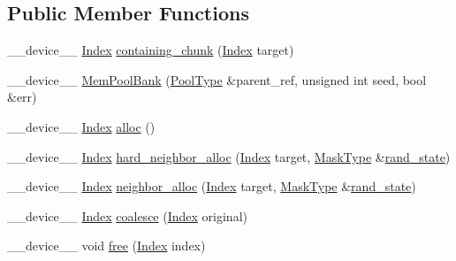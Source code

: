 \subsection*{Public Member Functions}
\begin{DoxyCompactItemize}
\item 
\-\_\-\-\_\-device\-\_\-\-\_\- \hyperlink{structMemPoolBank_a5f3e0490f2f4fe5dbf321cc00eb35007}{Index} \hyperlink{structMemPoolBank_abd671fc817e1dc55540b282f29ba30c7}{containing\-\_\-chunk} (\hyperlink{structMemPoolBank_a5f3e0490f2f4fe5dbf321cc00eb35007}{Index} target)
\item 
\-\_\-\-\_\-device\-\_\-\-\_\- \hyperlink{structMemPoolBank_a220229124f7046fdd4ff1d895786cddb}{Mem\-Pool\-Bank} (\hyperlink{structMemPoolBank_afae3596e9bd9f9245bc55fbe47356e96}{Pool\-Type} \&parent\-\_\-ref, unsigned int seed, bool \&err)
\item 
\-\_\-\-\_\-device\-\_\-\-\_\- \hyperlink{structMemPoolBank_a5f3e0490f2f4fe5dbf321cc00eb35007}{Index} \hyperlink{structMemPoolBank_aaec17b865ca8ea6a01991cede82db0e4}{alloc} ()
\item 
\-\_\-\-\_\-device\-\_\-\-\_\- \hyperlink{structMemPoolBank_a5f3e0490f2f4fe5dbf321cc00eb35007}{Index} \hyperlink{structMemPoolBank_ac569e5e2130db7ccb771a7553f20c20d}{hard\-\_\-neighbor\-\_\-alloc} (\hyperlink{structMemPoolBank_a5f3e0490f2f4fe5dbf321cc00eb35007}{Index} target, \hyperlink{structMemPoolBank_a35d618e084e7be124feef368925d46d5}{Mask\-Type} \&\hyperlink{structMemPoolBank_af9787855d48c00526151a602cb890f10}{rand\-\_\-state})
\item 
\-\_\-\-\_\-device\-\_\-\-\_\- \hyperlink{structMemPoolBank_a5f3e0490f2f4fe5dbf321cc00eb35007}{Index} \hyperlink{structMemPoolBank_a9b0e449e66be305417d76d036462b20a}{neighbor\-\_\-alloc} (\hyperlink{structMemPoolBank_a5f3e0490f2f4fe5dbf321cc00eb35007}{Index} target, \hyperlink{structMemPoolBank_a35d618e084e7be124feef368925d46d5}{Mask\-Type} \&\hyperlink{structMemPoolBank_af9787855d48c00526151a602cb890f10}{rand\-\_\-state})
\item 
\-\_\-\-\_\-device\-\_\-\-\_\- \hyperlink{structMemPoolBank_a5f3e0490f2f4fe5dbf321cc00eb35007}{Index} \hyperlink{structMemPoolBank_ade00e00d2225f23cc4ace6fa15ea9efc}{coalesce} (\hyperlink{structMemPoolBank_a5f3e0490f2f4fe5dbf321cc00eb35007}{Index} original)
\item 
\-\_\-\-\_\-device\-\_\-\-\_\- void \hyperlink{structMemPoolBank_aedee77671212371f77e63a5336836e4b}{free} (\hyperlink{structMemPoolBank_a5f3e0490f2f4fe5dbf321cc00eb35007}{Index} index)
\end{DoxyCompactItemize}

